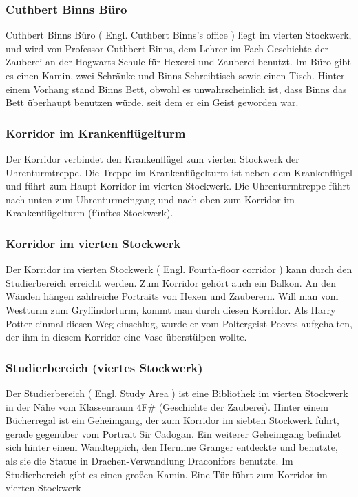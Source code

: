 \documentclass[a4paper, 10pt]{article}
\begin{document}
\subsubsection*{\large Cuthbert Binns Büro}
Cuthbert Binns Büro (  Engl.  Cuthbert Binns's office ) liegt im vierten Stockwerk, und wird von Professor Cuthbert Binns, dem Lehrer im Fach Geschichte der Zauberei an der Hogwarts-Schule für Hexerei und Zauberei benutzt. Im Büro gibt es einen Kamin, zwei Schränke und Binns Schreibtisch sowie einen Tisch. Hinter einem Vorhang stand Binns Bett, obwohl es unwahrscheinlich ist, dass Binns das Bett überhaupt benutzen würde, seit dem er ein Geist geworden war.
\subsubsection*{\large Korridor im Krankenflügelturm}
Der Korridor verbindet den Krankenflügel zum vierten Stockwerk der Uhrenturmtreppe. Die Treppe im Krankenflügelturm ist neben dem Krankenflügel und führt zum Haupt-Korridor im vierten Stockwerk. Die Uhrenturmtreppe führt nach unten zum Uhrenturmeingang und nach oben zum Korridor im Krankenflügelturm (fünftes Stockwerk).
\subsubsection*{\large Korridor im vierten Stockwerk}
Der Korridor im vierten Stockwerk (  Engl.  Fourth-floor corridor ) kann durch den Studierbereich erreicht werden. Zum Korridor gehört auch ein Balkon. An den Wänden hängen zahlreiche Portraits von Hexen und Zauberern. Will man vom Westturm zum Gryffindorturm, kommt man durch diesen Korridor. Als Harry Potter einmal diesen Weg einschlug, wurde er vom Poltergeist Peeves aufgehalten, der ihm in diesem Korridor eine Vase überstülpen wollte.
\subsubsection*{\large Studierbereich (viertes Stockwerk)}
Der Studierbereich (  Engl.  Study Area ) ist eine Bibliothek im vierten Stockwerk in der Nähe vom Klassenraum 4F# (Geschichte der Zauberei). Hinter einem Bücherregal ist ein Geheimgang, der zum Korridor im siebten Stockwerk führt, gerade gegenüber vom Portrait Sir Cadogan. Ein weiterer Geheimgang befindet sich hinter einem Wandteppich, den Hermine Granger entdeckte und benutzte, als sie die Statue in Drachen-Verwandlung Draconifors benutzte. Im Studierbereich gibt es einen großen Kamin. Eine Tür führt zum Korridor im vierten Stockwerk
\end{document}

